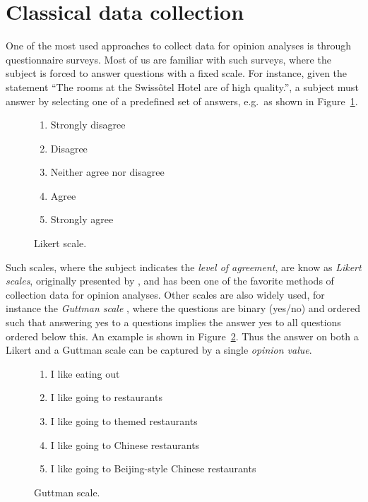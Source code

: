 \section{Classical data collection}
One of the most used approaches to collect data for opinion analyses is through questionnaire surveys. Most of us are familiar with such surveys, where the subject is forced to answer questions with a fixed scale. For instance, given the statement ``The rooms at the Swissôtel Hotel are of high quality.'', a subject must answer by selecting one of a predefined set of answers, e.g.\ as shown in Figure~\ref{fig:LikertScale}.
\begin{figure}[ht]
	\begin{cframed}{.7\textwidth}
		\begin{enumerate}
		  \item Strongly disagree
		  \item Disagree
		  \item Neither agree nor disagree
		  \item Agree
		  \item Strongly agree
		\end{enumerate}
	\end{cframed}
	\caption{Likert scale.}
	\label{fig:LikertScale}
\end{figure}

Such scales, where the subject indicates the \emph{level of agreement}, are know as \emph{Likert scales}, originally presented by \citeauthor{Likert} , and has been one of the favorite methods of collection data for opinion analyses. Other scales are also widely used, for instance the \emph{Guttman scale} \cite{guttman}, where the questions are  binary (yes/no) and ordered such that answering yes to a questions implies the answer yes to all questions ordered below this. An example is shown in Figure~\ref{fig:GuttmanScale}. Thus the answer on both a Likert and a Guttman scale can be captured by a single \emph{opinion value}.
\begin{figure}[ht]
	\begin{cframed}{.7\textwidth}
		\begin{enumerate}
		  \item I like eating out
		  \item I like going to restaurants
		  \item I like going to themed restaurants
		  \item I like going to Chinese restaurants
		  \item I like going to Beijing-style Chinese restaurants
		\end{enumerate}
	\end{cframed}
	\caption{Guttman scale.}
	\label{fig:GuttmanScale}
\end{figure}

